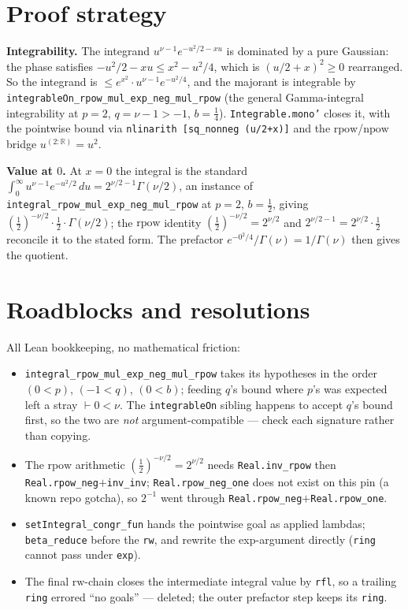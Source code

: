\documentclass[11pt]{article}
\begin{document}
\section{Proof strategy}
\textbf{Integrability.} The integrand $u^{\nu-1}e^{-u^2/2-xu}$ is dominated by a pure Gaussian: the
phase satisfies $-u^2/2-xu\le x^2-u^2/4$, which is $(u/2+x)^2\ge0$ rearranged. So the integrand is
$\le e^{x^2}\cdot u^{\nu-1}e^{-u^2/4}$, and the majorant is integrable by
\texttt{integrableOn\_rpow\_mul\_exp\_neg\_mul\_rpow} (the general Gamma-integral integrability at
$p=2$, $q=\nu-1>-1$, $b=\tfrac14$). \texttt{Integrable.mono'} closes it, with the pointwise bound via
\texttt{nlinarith [sq\_nonneg (u/2+x)]} and the $\mathrm{rpow}$/$\mathrm{npow}$ bridge
$u^{(2:\mathbb R)}=u^2$.

\textbf{Value at $0$.} At $x=0$ the integral is the standard $\int_0^\infty u^{\nu-1}e^{-u^2/2}\,du
=2^{\nu/2-1}\Gamma(\nu/2)$, an instance of \texttt{integral\_rpow\_mul\_exp\_neg\_mul\_rpow} at
$p=2$, $b=\tfrac12$, giving $(\tfrac12)^{-\nu/2}\cdot\tfrac12\cdot\Gamma(\nu/2)$; the $\mathrm{rpow}$
identity $(\tfrac12)^{-\nu/2}=2^{\nu/2}$ and $2^{\nu/2-1}=2^{\nu/2}\cdot\tfrac12$ reconcile it to the
stated form. The prefactor $e^{-0^2/4}/\Gamma(\nu)=1/\Gamma(\nu)$ then gives the quotient.

\section{Roadblocks and resolutions}
All Lean bookkeeping, no mathematical friction:
\begin{itemize}
\item \texttt{integral\_rpow\_mul\_exp\_neg\_mul\_rpow} takes its hypotheses in the order $(0<p)$,
$(-1<q)$, $(0<b)$; feeding $q$'s bound where $p$'s was expected left a stray $\vdash 0<\nu$. The
\texttt{integrableOn} sibling happens to accept $q$'s bound first, so the two are \emph{not}
argument-compatible --- check each signature rather than copying.
\item The $\mathrm{rpow}$ arithmetic $(\tfrac12)^{-\nu/2}=2^{\nu/2}$ needs
\texttt{Real.inv\_rpow} then \texttt{Real.rpow\_neg}$+$\texttt{inv\_inv}; \texttt{Real.rpow\_neg\_one}
does not exist on this pin (a known repo gotcha), so $2^{-1}$ went through
\texttt{Real.rpow\_neg}$+$\texttt{Real.rpow\_one}.
\item \texttt{setIntegral\_congr\_fun} hands the pointwise goal as applied lambdas; \texttt{beta\_reduce}
before the \texttt{rw}, and rewrite the exp-argument directly (\texttt{ring} cannot pass under
\texttt{exp}).
\item The final $\mathrm{rw}$-chain closes the intermediate integral value by \texttt{rfl}, so a
trailing \texttt{ring} errored ``no goals'' --- deleted; the outer prefactor step keeps its
\texttt{ring}.
\end{itemize}
\end{document}
